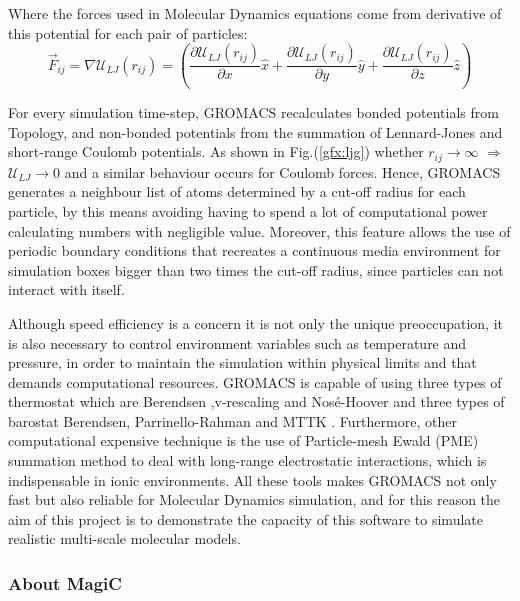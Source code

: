 \documentclass[10pt,a4paper,twoside]{article}
\begin{document}
Where the forces used in Molecular Dynamics equations come from derivative of this potential for each pair of particles:
\begin{equation}
\vec{F}_{ij} = \nabla\mathcal{U}_{LJ}(r_{ij}) = \left( \dfrac{\partial\mathcal{U}_{LJ}(r_{ij})}{\partial x}\hat{x} + \dfrac{\partial\mathcal{U}_{LJ}(r_{ij})}{\partial y}\hat{y}+\dfrac{\partial\mathcal{U}_{LJ}(r_{ij})}{\partial z}\hat{z}\right) 
\label{eqn:ljf}
\end{equation}

For every simulation time-step, GROMACS recalculates bonded potentials from Topology, and non-bonded potentials from the summation of Lennard-Jones and short-range Coulomb potentials. As shown in Fig.(\ref{gfx:ljg}) whether $r_{ij} \rightarrow \infty$ $\Rightarrow$ $\mathcal{U}_{LJ} \rightarrow 0$ and a similar behaviour occurs for Coulomb forces. Hence, GROMACS generates a neighbour list of atoms determined by a cut-off radius for each particle, by this means avoiding having to spend a lot of computational power calculating numbers with negligible value. Moreover, this feature allows the use of periodic boundary conditions that recreates a continuous media environment for simulation boxes bigger than  two times the cut-off radius, since particles can not interact with itself. 

Although speed efficiency is a concern it is not only the unique preoccupation, it is also necessary to control environment variables such as     temperature and pressure, in order to maintain the simulation within physical limits and that demands computational resources. GROMACS is capable of using three types of thermostat which are Berendsen ,v-rescaling and Nosé-Hoover  and three types of barostat Berendsen, Parrinello-Rahman and MTTK \cite{gromanual}. Furthermore, other computational expensive technique is the use of Particle-mesh Ewald (PME) summation method to deal with long-range electrostatic interactions, which is indispensable in ionic environments. All these tools makes GROMACS not only fast but also reliable for Molecular Dynamics simulation, and for this reason the aim of this project is to demonstrate the capacity of this software to simulate realistic multi-scale molecular models.
  
\subsubsection{About MagiC}
\end{document}
